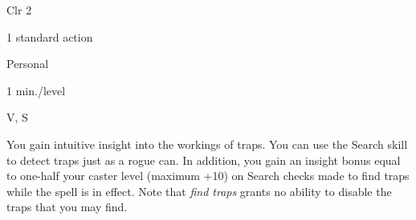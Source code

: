 
\begin{description*}
\item[Level:] Clr 2
\item[Casting Time:] 1 standard action
\item[Range:] Personal
\item[Duration:] 1 min./level
\item[Components:] V, S
\end{description*}

You gain intuitive insight into the workings of traps. You can use the Search skill
to detect traps just as a rogue can. In addition, you gain an insight bonus equal
to one-half your caster level (maximum +10) on Search checks made to find traps
while the spell is in effect.
Note that \textit{find traps} grants no ability to disable the traps that you may
find.